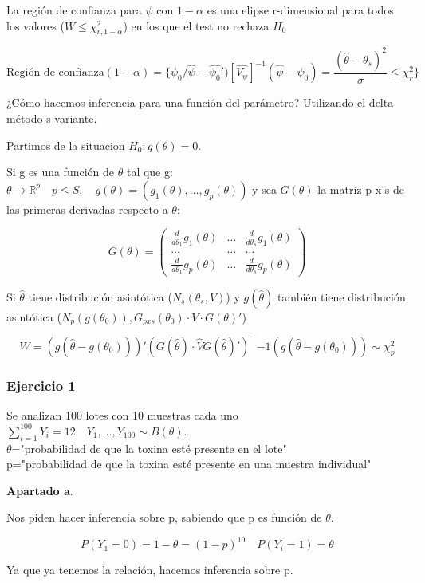 La región de confianza para $\psi$ con $1-\alpha$ es una elipse r-dimensional para todos los valores ($W \leq \chi^2_{r,1-\alpha}$) en los que el test no rechaza $H_0$

\[
\text{Región de confianza}(1-\alpha)=\{ \psi_0 /\hat{\psi}-\hat{\psi_0}')[\hat{V_\psi}]^{-1}(\hat{\psi}-\psi_0)=\frac{(\hat{\theta}-\theta_s)^2}{\sigma}\leq\chi^2_r\}
\]

¿Cómo hacemos inferencia para una función del parámetro?
Utilizando el delta método s-variante.

Partimos de la situacion $H_0:g(\theta)=0$.

Si g es una función de $\theta$ tal que g:$\theta \to \mathbb{R}^p \quad p \leq S, \quad g(\theta)=(g_1(\theta),\dots,g_p(\theta))$
y sea $G(\theta)$ la matriz p x s de las primeras derivadas respecto a $\theta$:

\[
G(\theta)=
\begin{pmatrix}
    \frac{d}{d \theta_1} g_1(\theta) & \dots & \frac{d}{d \theta_s} g_1(\theta)\\
    \dots &\dots & \dots \\
    \frac{d}{d \theta_1} g_p(\theta) & \dots &\frac{d}{d \theta_s} g_p(\theta)
\end{pmatrix}
\]

Si $\hat{\theta}$ tiene distribución asintótica ($N_s(\theta_s,V)$)
y $g(\hat{\theta})$ también tiene distribución asintótica ($N_p(g(\theta_0)),G_{pxs}(\theta_0)\cdot V \cdot G(\theta)'$)

\[
W=(g(\hat{\theta}-g(\theta_0)))'(G(\hat{\theta})\cdot \hat{V} G(\hat{\theta})')^-{-1}(g(\hat{\theta}-g(\theta_0))) \sim \chi^2_p
\]

\subsubsection*{Ejercicio 1}
Se analizan 100 lotes con 10 muestras cada uno $\sum_{i=1}^{100}Y_i=12 \quad Y_1,\dots,Y_{100} \sim B(\theta)$.
\\$\theta$="probabilidad de que la toxina esté presente en el lote"
\\ p="probabilidad de que la toxina esté presente en una muestra individual"

\textbf{Apartado a}.

Nos piden hacer inferencia sobre p, sabiendo que p es función de $\theta$.

\[
P(Y_1=0)=1-\theta=(1-p)^{10} \quad P(Y_i=1)=\theta
\]

Ya que ya tenemos la relación, hacemos inferencia sobre p.

